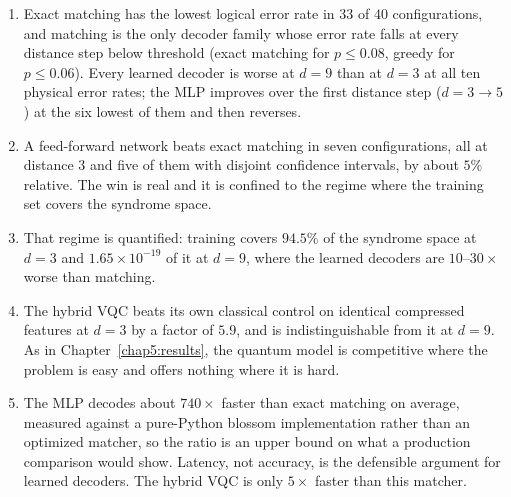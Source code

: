 \documentclass[Thesis.tex]{subfiles}
\begin{document}
\begin{enumerate}
    \item Exact matching has the lowest logical error rate in $33$ of $40$
    configurations, and matching is the only decoder family whose error rate falls at
    every distance step below threshold (exact matching for $p \leq 0.08$, greedy for
    $p \leq 0.06$). Every learned decoder is worse at $d = 9$ than at $d = 3$ at all
    ten physical error rates; the MLP improves over the first distance step
    ($d = 3 \rightarrow 5$) at the six lowest of them and then reverses.

    \item A feed-forward network beats exact matching in seven configurations, all at
    distance 3 and five of them with disjoint confidence intervals, by about $5\%$
    relative. The win is real and it is confined to the regime where the training set
    covers the syndrome space.

    \item That regime is quantified: training covers $94.5\%$ of the syndrome space
    at $d = 3$ and $1.65 \times 10^{-19}$ of it at $d = 9$, where the learned
    decoders are $10$--$30\times$ worse than matching.

    \item The hybrid VQC beats its own classical control on identical compressed
    features at $d = 3$ by a factor of $5.9$, and is indistinguishable from it at
    $d = 9$. As in Chapter~\ref{chap5:results}, the quantum model is competitive
    where the problem is easy and offers nothing where it is hard.

        \item The MLP decodes about $740\times$ faster than exact matching on average,
    measured against a pure-Python blossom implementation rather than an optimized
    matcher, so the ratio is an upper bound on what a production comparison would
    show. Latency, not accuracy, is the defensible argument for learned decoders.
    The hybrid VQC is only $5\times$ faster than this matcher.
\end{enumerate}
\end{document}
